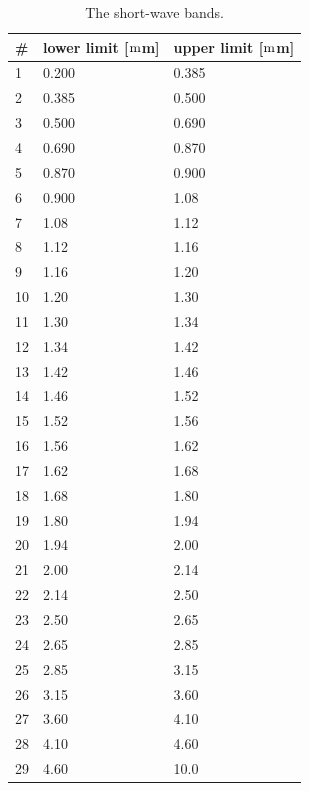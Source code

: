 \documentclass[11pt,numberedappendix,twocolappendix,]{emulateapj}
\begin{document}
\begin{table}
\centering
\caption{The short-wave bands.}
\label{tab:short-wave}
\begin{tabular}{l|l|l} \hline \hline
\# & lower limit [${\rm m}$m] & upper limit [${\rm m}$m] \\ \hline 
    1 &       0.200 &    0.385 \\
    2 &       0.385 &    0.500 \\
    3 &       0.500 &    0.690 \\
    4 &       0.690 &    0.870 \\
    5 &       0.870 &    0.900 \\
    6 &       0.900 &    1.08 \\
    7 &       1.08  &   1.12 \\
    8 &       1.12  &   1.16 \\
    9 &       1.16  &   1.20 \\
   10 &       1.20  &   1.30 \\
   11 &       1.30  &   1.34 \\
   12 &       1.34  &   1.42 \\
   13 &       1.42  &   1.46 \\
   14 &       1.46  &   1.52 \\
   15 &       1.52  &   1.56 \\
   16 &       1.56  &   1.62 \\
   17 &       1.62  &   1.68 \\
   18 &       1.68  &   1.80 \\
   19 &       1.80  &   1.94 \\
   20 &       1.94  &   2.00 \\
   21 &       2.00  &   2.14 \\
   22 &       2.14  &   2.50 \\
   23 &       2.50  &   2.65 \\
   24 &       2.65  &   2.85 \\
   25 &       2.85  &   3.15 \\
   26 &       3.15  &   3.60 \\
   27 &       3.60  &   4.10 \\
   28 &       4.10  &   4.60 \\
   29 &       4.60  &   10.0 \\ \hline
\end{tabular}
\end{table}



\end{document}
